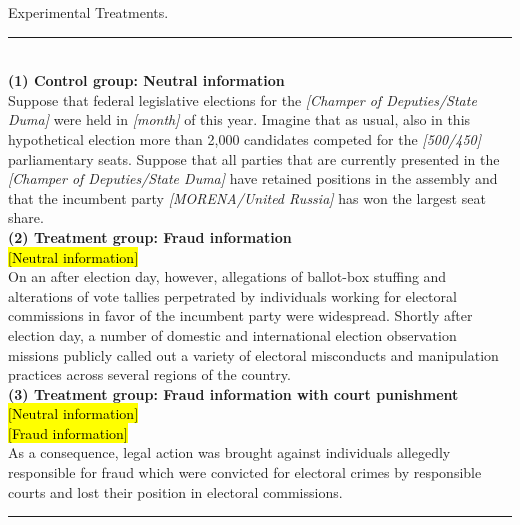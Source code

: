 \documentclass[11pt, ngerman,english,a4]{article}
\begin{document}
\singlespacing
\begin{table}[H]
    \caption{Experimental Treatments.}
    \label{tab:treatments}

\hrule \\
\vspace{0.5cm}
\textbf{(1) Control group: Neutral information} \\
Suppose that federal legislative elections for the \textit{[Champer of Deputies/State Duma]} were held in \textit{[month]} of this year. Imagine that as usual, also in this hypothetical election more than 2,000 candidates competed for the \textit{[500/450]} parliamentary seats. Suppose that all parties that are currently presented in the \textit{[Champer of Deputies/State Duma]} have retained positions in the assembly and that the incumbent party \textit{[MORENA/United Russia]} has won the largest seat share. \\

\textbf{(2) Treatment group: Fraud information} \\
\hl{$[$Neutral information$]$} \\
On an after election day, however, allegations of ballot-box stuffing and alterations of vote tallies perpetrated by individuals working for electoral commissions in favor of the incumbent party were widespread. Shortly after election day, a number of domestic and international election observation missions publicly called out a variety of electoral misconducts and manipulation practices across several regions of the country. \\


\textbf{(3) Treatment group: Fraud information with court punishment} \\
\hl{$[$Neutral information$]$} \\
\hl{$[$Fraud information$]$} \\
As a consequence, legal action was brought against individuals allegedly responsible for fraud which were convicted for electoral crimes by responsible courts and lost their position in electoral commissions.
\vspace{0.5cm}
\hrule
\end{table}
\doublespacing
\end{document}
